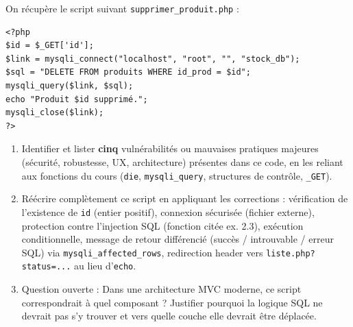 \documentclass[11pt]{article}
\begin{document}
\begin{exercice}
On récupère le script suivant \texttt{supprimer\_produit.php} :

\begin{verbatim}
<?php
$id = $_GET['id'];
$link = mysqli_connect("localhost", "root", "", "stock_db");
$sql = "DELETE FROM produits WHERE id_prod = $id";
mysqli_query($link, $sql);
echo "Produit $id supprimé.";
mysqli_close($link);
?>
\end{verbatim}

\begin{enumerate}
    \item Identifier et lister \textbf{cinq} vulnérabilités ou mauvaises pratiques majeures (sécurité, robustesse, UX, architecture) présentes dans ce code, en les reliant aux fonctions du cours (\texttt{die}, \texttt{mysqli\_query}, structures de contrôle, \texttt{\_GET}).
    \item Réécrire complètement ce script en appliquant les corrections : vérification de l'existence de \texttt{id} (entier positif), connexion sécurisée (fichier externe), protection contre l'injection SQL (fonction citée ex. 2.3), exécution conditionnelle, message de retour différencié (succès / introuvable / erreur SQL) via \texttt{mysqli\_affected\_rows}, redirection header vers \texttt{liste.php?status=...} au lieu d'\texttt{echo}.
    \item Question ouverte : Dans une architecture MVC moderne, ce script correspondrait à quel composant ? Justifier pourquoi la logique SQL ne devrait pas s'y trouver et vers quelle couche elle devrait être déplacée.
\end{enumerate}
\end{exercice}
\end{document}
